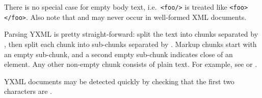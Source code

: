 \begin{isabellebody}
\begin{isamarkuptext}
\begin{enumerate}
  There is no special case for empty body text, i.e.\ \verb|<foo/>| is treated like \verb|<foo></foo>|.  Also note that
   and  may never occur in
  well-formed XML documents.

  \end{enumerate}

  Parsing YXML is pretty straight-forward: split the text into chunks
  separated by , then split each chunk into
  sub-chunks separated by .  Markup chunks start
  with an empty sub-chunk, and a second empty sub-chunk indicates
  close of an element.  Any other non-empty chunk consists of plain
  text.  For example, see \hyperlink{file.~~/src/Pure/General/yxml.ML}{\mbox{}} or
  \hyperlink{file.~~/src/Pure/General/yxml.scala}{\mbox{}}.

  YXML documents may be detected quickly by checking that the first
  two characters are .%
\end{isamarkuptext}%
\isamarkuptrue%
%
\isadelimtheory
%
\endisadelimtheory
%
\isatagtheory
{}\isamarkupfalse%
%
\endisatagtheory
{\isafoldtheory}%
%
\isadelimtheory
%
\endisadelimtheory
\end{isabellebody}%
